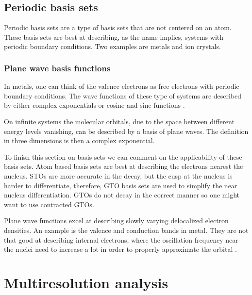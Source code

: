 \documentclass[../Thesis.tex]{subfiles}
\begin{document}
\subsection{Periodic basis sets}
Periodic basis sets are a type of basis sets that are not centered on an atom.
These basis sets are best at describing, as the name implies, systems with periodic
boundary conditions. Two examples are metals and ion crystals.

\subsubsection{Plane wave basis functions}
In metals, one can think of the valence electrons as free electrons with
periodic boundary conditions. The wave functions of these type of systems are
described by either complex exponentials or cosine and sine functions \cite{Jensen:2017}.

On infinite systems the molecular orbitals, due to the space between different energy levels
vanishing, can be described by a basis of plane waves. The definition in three dimensions
is then a complex exponential.

To finish this section on basis sets we can comment on the applicability of these
basis sets. Atom based basis sets are best at describing the electrons nearest the
nucleus. \acp{STO} are more accurate in the decay, but the cusp at the nucleus is
harder to differentiate, therefore, \ac{GTO} basis sets are used to simplify the
near nucleus differentiation. \acp{GTO} do not decay in the correct manner so one
might want to use contracted \acp{GTO}.

Plane wave functions excel at describing slowly varying delocalized electron densities.
An example is the valence and conduction bands in metal. They are not that good at
describing internal electrons, where the oscillation frequency near the nuclei need to increase a lot
in order to properly approximate the orbital \cite{Jensen:2017}.

\section{Multiresolution analysis}
\end{document}
